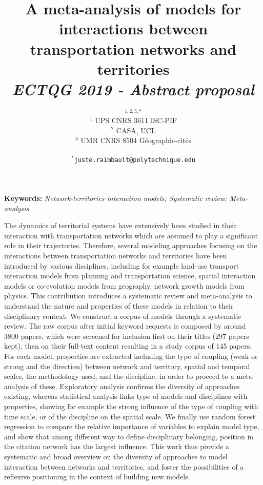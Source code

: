 \documentclass[11pt]{article}
\begin{document}
\title{A meta-analysis of models for interactions between transportation networks and territories
\\\medskip
\textit{ECTQG 2019 - Abstract proposal}
}
\author{$^{1,2,3,\ast}$\medskip\\
$^1$ UPS CNRS 3611 ISC-PIF\\
$^2$ CASA, UCL\\
$^3$ UMR CNRS 8504 G{\'e}ographie-cit{\'e}s\\
\medskip\\
$^{\ast}$\texttt{juste.raimbault@polytechnique.edu}
}
\date{}

\maketitle

\justify



\textbf{Keywords: }\textit{Network-territories interaction models; Systematic review; Meta-analysis}

\medskip


The dynamics of territorial systems have extensively been studied in their interaction with transportation networks which are assumed to play a significant role in their trajectories. Therefore, several modeling approaches focusing on the interactions between transportation networks and territories have been introduced by various disciplines, including for example land-use transport interaction models from planning and transportation science, spatial interaction models or co-evolution models from geography, network growth models from physics. This contribution introduces a systematic review and meta-analysis to understand the nature and properties of these models in relation to their disciplinary context. We construct a corpus of models through a systematic review. The raw corpus after initial keyword requests is composed by around 3800 papers, which were screened for inclusion first on their titles (297 papers kept), then on their full-text content resulting in a study corpus of 145 papers. For each model, properties are extracted including the type of coupling (weak or strong and the direction) between network and territory, spatial and temporal scales, the methodology used, and the discipline, in order to proceed to a meta-analysis of these. Exploratory analysis confirms the diversity of approaches existing, whereas statistical analysis links type of models and disciplines with properties, showing for example the strong influence of the type of coupling with time scale, or of the discipline on the spatial scale. We finally use random forest regression to compare the relative importance of variables to explain model type, and show that among different way to define disciplinary belonging, position in the citation network has the largest influence. This work thus provide a systematic and broad overview on the diversity of approaches to model interaction between networks and territories, and foster the possibilities of a reflexive positioning in the context of building new models.
\end{document}
